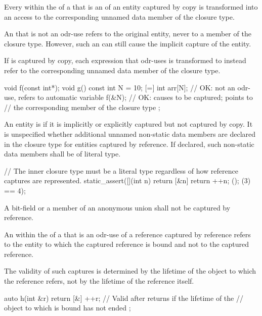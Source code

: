 \pnum
Every  within the  of a
 that is an  of an
entity captured by copy is transformed into an access to the corresponding unnamed data
member of the closure type.
\begin{note}
An  that is not an odr-use refers to
the original entity, never to a member of the closure type.
However, such
an  can still cause the implicit capture of the
entity.
\end{note}
If  is captured by copy, each expression that odr-uses  is
transformed to instead refer to the corresponding unnamed data member of the closure type.
\begin{example}
\begin{codeblock}
void f(const int*);
void g() {
  const int N = 10;
  [=] {
    int arr[N];     // OK: not an odr-use, refers to automatic variable
    f(&N);          // OK: causes  to be captured;  points to
                    // the corresponding member of the closure type
  };
}
\end{codeblock}
\end{example}

\pnum
An entity is  if it is implicitly or explicitly
captured but not captured by copy. It is unspecified whether additional unnamed
non-static data members are declared in the closure type for entities captured by
reference.
If declared, such non-static data members shall be of literal type.
\begin{example}
\begin{codeblock}
// The inner closure type must be a literal type regardless of how reference captures are represented.
static_assert([](int n) { return [&n] { return ++n; }(); }(3) == 4);
\end{codeblock}
\end{example}
A bit-field or a member of an anonymous union
shall not be captured by reference.

\pnum
An  within
the  of a 
that is an odr-use of a reference captured by reference
refers to the entity to which the captured reference is bound and
not to the captured reference.
\begin{note}
The validity of such captures is determined by
the lifetime of the object to which the reference refers,
not by the lifetime of the reference itself.
\end{note}
\begin{example}
\begin{codeblock}
auto h(int &r) {
  return [&] {
    ++r;            // Valid after  returns if the lifetime of the
                    // object to which  is bound has not ended
  };
}
\end{codeblock}
\end{example}


